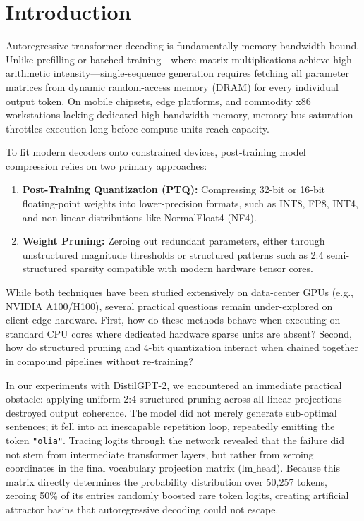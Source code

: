 \documentclass[conference]{IEEEtran}
\begin{document}
\section{Introduction}
Autoregressive transformer decoding is fundamentally memory-bandwidth bound. Unlike prefilling or batched training---where matrix multiplications achieve high arithmetic intensity---single-sequence generation requires fetching all parameter matrices from dynamic random-access memory (DRAM) for every individual output token. On mobile chipsets, edge platforms, and commodity x86 workstations lacking dedicated high-bandwidth memory, memory bus saturation throttles execution long before compute units reach capacity.

To fit modern decoders onto constrained devices, post-training model compression relies on two primary approaches:
\begin{enumerate}
    \item \textbf{Post-Training Quantization (PTQ):} Compressing 32-bit or 16-bit floating-point weights into lower-precision formats, such as INT8, FP8, INT4, and non-linear distributions like NormalFloat4 (NF4).
    \item \textbf{Weight Pruning:} Zeroing out redundant parameters, either through unstructured magnitude thresholds or structured patterns such as 2:4 semi-structured sparsity compatible with modern hardware tensor cores.
\end{enumerate}

While both techniques have been studied extensively on data-center GPUs (e.g., NVIDIA A100/H100), several practical questions remain under-explored on client-edge hardware. First, how do these methods behave when executing on standard CPU cores where dedicated hardware sparse units are absent? Second, how do structured pruning and 4-bit quantization interact when chained together in compound pipelines without re-training?

In our experiments with DistilGPT-2, we encountered an immediate practical obstacle: applying uniform 2:4 structured pruning across all linear projections destroyed output coherence. The model did not merely generate sub-optimal sentences; it fell into an inescapable repetition loop, repeatedly emitting the token \texttt{"olia"}. Tracing logits through the network revealed that the failure did not stem from intermediate transformer layers, but rather from zeroing coordinates in the final vocabulary projection matrix ($\text{lm\_head}$). Because this matrix directly determines the probability distribution over 50,257 tokens, zeroing 50\% of its entries randomly boosted rare token logits, creating artificial attractor basins that autoregressive decoding could not escape.
\end{document}
